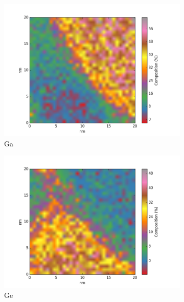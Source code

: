 \begin{figure}
\begin{subfigure}{0.45\linewidth}
		\includegraphics[width=\linewidth]{fig/q-new/D/oldzeta/Ga_zeta}
		\caption{Ga}
		\label{fig:Dga}
	\end{subfigure}%
	\hfill
	\begin{subfigure}{0.45\textwidth}	
		\includegraphics[width=\textwidth]{fig/q-new/D/oldzeta/Ge_zeta}
		\caption{Ge}
		\label{fig:Dge}
	\end{subfigure}
	\hfill
	\begin{subfigure}{0.45\textwidth}

\end{subfigure}
\end{figure}
